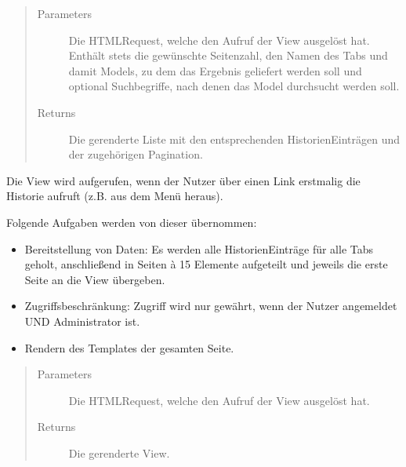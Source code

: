 \documentclass[letterpaper,10pt,english]{sphinxmanual}
\begin{document}
\begin{fulllineitems}
\begin{itemize}
\end{itemize}
\begin{quote}\begin{description}
\item[{Parameters}] \leavevmode
{} \textendash{} Die HTML\sphinxhyphen{}Request, welche den Aufruf der View ausgelöst hat. 
Enthält stets die gewünschte Seitenzahl, den Namen des Tabs und damit Models, zu dem das Ergebnis geliefert werden soll und optional Suchbegriffe, nach denen das Model durchsucht werden soll.

\item[{Returns}] \leavevmode
Die gerenderte Liste mit den entsprechenden Historien\sphinxhyphen{}Einträgen und der zugehörigen Pagination.

\end{description}\end{quote}

\end{fulllineitems}


\begin{fulllineitems}
\label{\detokenize{masterCodeDoc:historie.views.list}}
Die \sphinxhyphen{}View wird aufgerufen, wenn der Nutzer über einen Link erstmalig die Historie aufruft (z.B. aus dem Menü heraus).

Folgende Aufgaben werden von dieser übernommen:
\begin{itemize}
\item {} 
Bereitstellung von Daten: Es werden alle Historien\sphinxhyphen{}Einträge für alle Tabs geholt, anschließend in Seiten à 15 Elemente aufgeteilt und jeweils die erste Seite an die View übergeben.

\item {} 
Zugriffsbeschränkung: Zugriff wird nur gewährt, wenn der Nutzer angemeldet UND Administrator ist.

\item {} 
Rendern des Templates der gesamten Seite.

\end{itemize}
\begin{quote}\begin{description}
\item[{Parameters}] \leavevmode
{} \textendash{} Die HTML\sphinxhyphen{}Request, welche den Aufruf der View ausgelöst hat.

\item[{Returns}] \leavevmode
Die gerenderte View.

\end{description}\end{quote}

\end{fulllineitems}
\end{document}
